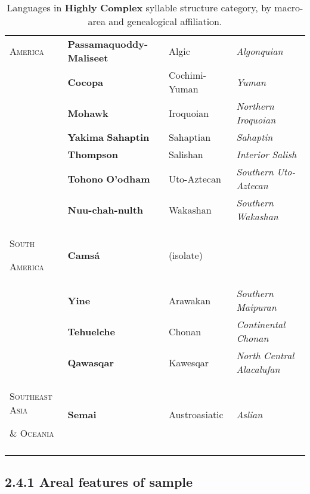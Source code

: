 \begin{table}
\begin{tabularx}{\textwidth}{XXXX}
\textsc{America} & \textbf{Passamaquoddy-Maliseet} & Algic & \textit{Algonquian}\\
\hhline{-~~~} & \textbf{Cocopa} & Cochimi-Yuman & \textit{Yuman}\\
& \textbf{Mohawk} & Iroquoian & \textit{Northern} \textit{Iroquoian}\\
& \textbf{Yakima} \textbf{Sahaptin} & Sahaptian & \textit{Sahaptin}\\
& \textbf{Thompson} & Salishan & \textit{Interior} \textit{Salish}\\
& \textbf{Tohono} \textbf{O’odham} & Uto-Aztecan & \textit{Southern} \textit{Uto-Aztecan}\\
& \textbf{Nuu-chah-nulth} & Wakashan & \textit{Southern} \textit{Wakashan}\\
\textsc{South} 

\textsc{America} & \textbf{Camsá} & (isolate) & \\
\hhline{-~~~} & \textbf{Yine} & Arawakan & \textit{Southern} \textit{Maipuran}\\
& \textbf{Tehuelche} & Chonan & \textit{Continental} \textit{Chonan}\\
& \textbf{Qawasqar} & Kawesqar & \textit{North} \textit{Central} \textit{Alacalufan}\\
\textsc{Southeast} \textsc{Asia} 

\textsc{\&} \textsc{Oceania} & \textbf{Semai} & Austroasiatic & \textit{Aslian}\\
\lspbottomrule
\end{tabularx}
\caption{\label{2.7}Languages in \textbf{Highly} \textbf{Complex} syllable structure category, by macro-area and genealogical affiliation.}
\end{table}

\subsection{2.4.1 Areal features of sample}

